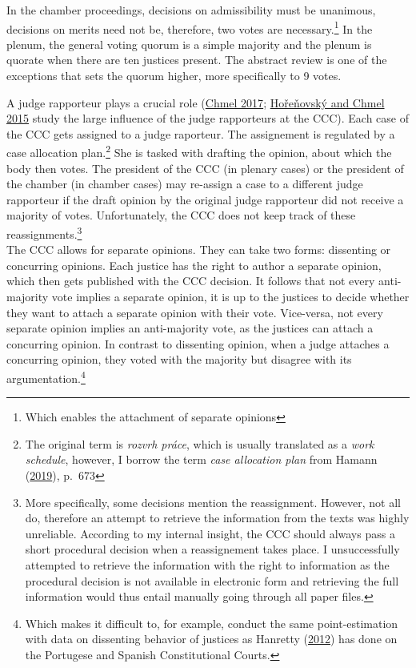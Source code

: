 \documentclass[
  11pt,
]{article}
\begin{document}
In the chamber proceedings, decisions on admissibility must be
unanimous, decisions on merits need not be, therefore, two votes are
necessary.\footnote{Which enables the attachment of separate opinions}
In the plenum, the general voting quorum is a simple majority and the
plenum is quorate when there are ten justices present. The abstract
review is one of the exceptions that sets the quorum higher, more
specifically to 9 votes.

A judge rapporteur plays a crucial role
(\protect\hyperlink{ref-chmelZpravodajoveSenatyVliv2017}{Chmel 2017};
\protect\hyperlink{ref-horenovskyProcessMakingConstitutional2015}{Hořeňovský
and Chmel 2015} study the large influence of the judge rapporteurs at
the CCC). Each case of the CCC gets assigned to a judge raporteur. The
assignement is regulated by a case allocation plan.\footnote{The
  original term is \emph{rozvrh práce}, which is usually translated as a
  \emph{work schedule}, however, I borrow the term \emph{case allocation
  plan} from Hamann
  (\protect\hyperlink{ref-hamannGermanFederalCourts2019}{2019}), p.~673}
She is tasked with drafting the opinion, about which the body then
votes. The president of the CCC (in plenary cases) or the president of
the chamber (in chamber cases) may re-assign a case to a different judge
rapporteur if the draft opinion by the original judge rapporteur did not
receive a majority of votes. Unfortunately, the CCC does not keep track
of these reassignments.\footnote{More specifically, some decisions
  mention the reassignment. However, not all do, therefore an attempt to
  retrieve the information from the texts was highly unreliable.
  According to my internal insight, the CCC should always pass a short
  procedural decision when a reassignement takes place. I unsuccessfully
  attempted to retrieve the information with the right to information as
  the procedural decision is not available in electronic form and
  retrieving the full information would thus entail manually going
  through all paper files.}\\

The CCC allows for separate opinions. They can take two forms:
dissenting or concurring opinions. Each justice has the right to author
a separate opinion, which then gets published with the CCC decision. It
follows that not every anti-majority vote implies a separate opinion, it
is up to the justices to decide whether they want to attach a separate
opinion with their vote. Vice-versa, not every separate opinion implies
an anti-majority vote, as the justices can attach a concurring opinion.
In contrast to dissenting opinion, when a judge attaches a concurring
opinion, they voted with the majority but disagree with its
argumentation.\footnote{Which makes it difficult to, for example,
  conduct the same point-estimation with data on dissenting behavior of
  justices as Hanretty
  (\protect\hyperlink{ref-hanrettyDissentIberiaIdeal2012}{2012}) has
  done on the Portugese and Spanish Constitutional Courts.}
\end{document}
